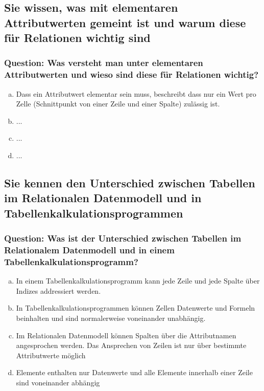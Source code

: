 \documentclass{article}
\begin{document}
\begin{adjustwidth}{2em}{2em}
\begin{adjustwidth}{2em}{2em}
			\subsection{Sie wissen, was mit elementaren Attributwerten gemeint ist und warum diese für Relationen wichtig sind}
			\begin{adjustwidth}{1em}{}
				\subsubsection*{Question: Was versteht man unter elementaren Attributwerten und wieso sind diese für Relationen wichtig?}
				\begin{adjustwidth}{1em}{}
					\begin{enumerate}[(a)]
						\item Dass ein Attributwert elementar sein muss, beschreibt dass nur ein Wert pro Zelle (Schnittpunkt von einer Zeile und einer Spalte) zulässig  ist.
						\item ...
						\item ...
						\item ...
					\end{enumerate}
				\end{adjustwidth}
			\end{adjustwidth}
			\subsection{Sie kennen den Unterschied zwischen Tabellen im Relationalen Datenmodell und in Tabellenkalkulationsprogrammen}
			\begin{adjustwidth}{1em}{}
				\subsubsection*{Question: Was ist der Unterschied zwischen Tabellen im Relationalem Datenmodell und in einem Tabellenkalkulationsprogramm?}
				\begin{adjustwidth}{1em}{}
					\begin{enumerate}[(a)]
						\item In einem Tabellenkalkulationsprogramm kann jede Zeile und jede Spalte über Indizes addressiert werden.
						\item In Tabellenkalkulationsprogrammen können Zellen Datenwerte und Formeln beinhalten und sind normalerweise voneinander unabhängig.
						\item Im Relationalen Datenmodell können Spalten über die Attributnamen angesprochen werden. Das Ansprechen von Zeilen ist nur über bestimmte Attributwerte möglich
						\item Elemente enthalten nur Datenwerte und alle Elemente innerhalb einer Zeile sind voneinander abhängig
					\end{enumerate}
				\end{adjustwidth}
			\end{adjustwidth}

\end{adjustwidth}
\end{adjustwidth}
\end{document}

